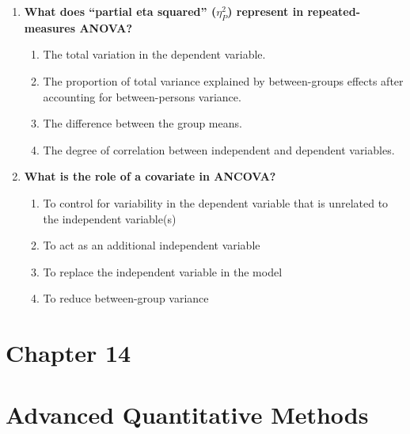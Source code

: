 \documentclass[
  letterpaper,
  DIV=11,
  numbers=noendperiod]{scrreprt}
\begin{document}
\begin{enumerate}
  \begin{enumerate}
  \def\labelenumii{\alph{enumii}.}
  \item
    All group means are equal.
  \item
    The dependent variable is unrelated to the conditions tested.
  \item
    The assumptions of sphericity have been violated.
  \item
    There is a difference in at least one pair of group means.
  \end{enumerate}
\item
  \textbf{What does ``partial eta squared'' (\(\eta^2_P\)) represent in
  repeated-measures ANOVA?}

  \begin{enumerate}
  \def\labelenumii{\alph{enumii}.}
  \item
    The total variation in the dependent variable.
  \item
    The proportion of total variance explained by between-groups effects
    after accounting for between-persons variance.
  \item
    The difference between the group means.
  \item
    The degree of correlation between independent and dependent
    variables.
  \end{enumerate}
\item
  \textbf{What is the role of a covariate in ANCOVA?}

  \begin{enumerate}
  \def\labelenumii{\alph{enumii}.}
  \item
    To control for variability in the dependent variable that is
    unrelated to the independent variable(s)
  \item
    To act as an additional independent variable
  \item
    To replace the independent variable in the model
  \item
    To reduce between-group variance
  \end{enumerate}
\end{enumerate}


\chapter{Chapter 14}\label{chapter-14}


\chapter*{Advanced Quantitative
Methods}\label{advanced-quantitative-methods}
\end{document}
